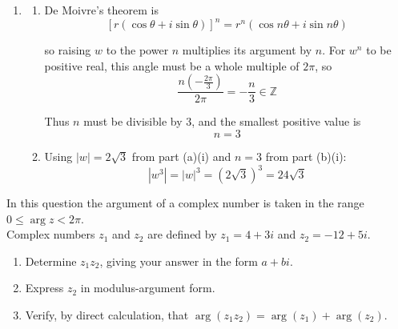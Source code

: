 \documentclass[leqno]{article}
\begin{document}
\begin{enumerate}[
  label=\textbf{\arabic*.},
  leftmargin=*,
  topsep=0pt,
  partopsep=0pt,
  parsep=0pt
]
\begin{djsSolution}
\begin{enumerate}[label=\textbf{(\alph*)}, start=1]
\begin{enumerate}[label=(\roman*), start=1]
\item The minus sign before \(i\sin\left(\frac{5\pi}{6}\right)\) means that \(z_2\) has argument \(-\frac{5\pi}{6}\). Adding the arguments gives a value in the required principal range:
\[
\arg(z_1z_2)=\frac{\pi}{6}-\frac{5\pi}{6}=-\frac{2\pi}{3}
\]

\end{enumerate}
\item
\begin{enumerate}[label=(\roman*), start=1]
\item De Moivre's theorem is
\[
\left[r(\cos\theta+i\sin\theta)\right]^n=r^n(\cos n\theta+i\sin n\theta)
\]

so raising \(w\) to the power \(n\) multiplies its argument by \(n\). For \(w^n\) to be positive real, this angle must be a whole multiple of \(2\pi\), so
\[
\frac{n\left(-\frac{2\pi}{3}\right)}{2\pi}=-\frac{n}{3}\in\mathbb{Z}
\]

Thus \(n\) must be divisible by \(3\), and the smallest positive value is
\[
n=3
\]

\item Using \(|w|=2\sqrt{3}\) from part (a)(i) and \(n=3\) from part (b)(i):
\[
|w^3|=|w|^3=(2\sqrt{3})^3=24\sqrt{3}
\]

\end{enumerate}
\end{enumerate}
\end{djsSolution}

\newpage

\questionitem

In this question the argument of a complex number is taken in the range $0\leq\arg z<2\pi$. \\
Complex numbers $z_1$ and $z_2$ are defined by $z_1=4+3i$ and $z_2=-12+5i$. \\
\begin{enumerate}[label=\textbf{(\alph*)}]
\item Determine $z_1z_2$, giving your answer in the form $a+bi$.  \\
\item Express $z_2$ in modulus-argument form.  \\
\item Verify, by direct calculation, that $\arg(z_1z_2)=\arg(z_1)+\arg(z_2)$.  \\
\end{enumerate}

\vspace*{10pt}


\end{enumerate}
\end{document}
